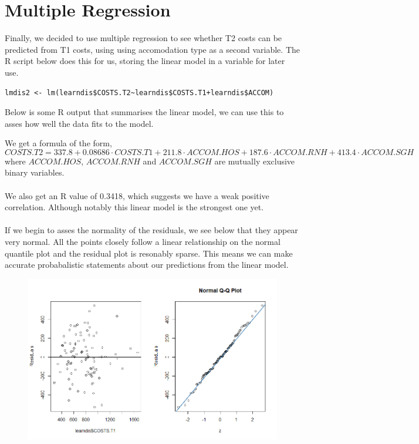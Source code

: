 \documentclass[]{article}
\begin{document}
\section{Multiple Regression}
Finally, we decided to use multiple regression to see whether T2 costs can be predicted from T1 costs, using using accomodation type as a second variable. The R script below does this for us, storing the linear model in a variable for later use.
\begin{lstlisting}
lmdis2 <- lm(learndis$COSTS.T2~learndis$COSTS.T1+learndis$ACCOM)
\end{lstlisting}
Below is some R output that summarises the linear model, we can use this to asses how well the data fits to the model.

We get a formula of the form,
$$COSTS.T2 = 337.8 + 0.08686 \cdot COSTS.T1 + 211.8 \cdot ACCOM.HOS + 187.6 \cdot ACCOM.RNH + 413.4 \cdot ACCOM.SGH$$
where $ACCOM.HOS$, $ACCOM.RNH$ and $ACCOM.SGH$ are mutually exclusive binary variables.
\\
\\
We also get an R value of 0.3418, which suggests we have a weak positive correlation. Although notably this linear model is the strongest one yet.
\\
\\
If we begin to asses the normality of the residuals, we see below that they appear very normal. All the points closely follow a linear relationship on the normal quantile plot and the residual plot is resonably sparse. This means we can make accurate probabalistic statements about our predictions from the linear model.
\begin{figure}[H]
\centering
\includegraphics[width=15cm]{RStudio/jpeg/Mult_Norm.png}
\end{figure}
\end{document}
